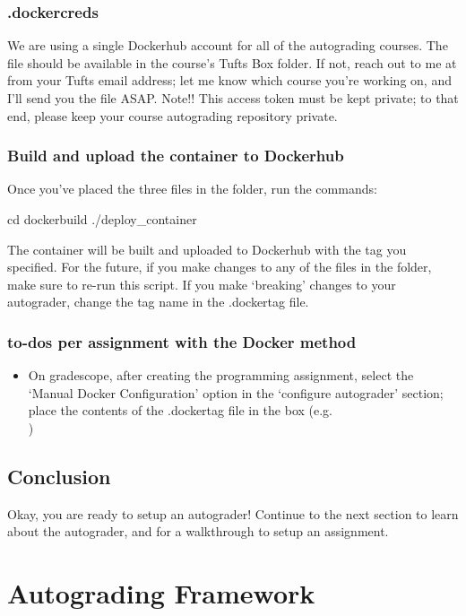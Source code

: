\documentclass[11pt]{report}
\begin{document}
\subsection*{.dockercreds}
We are using a single Dockerhub account for all of the autograding courses. The file
 should be available in the course's Tufts Box folder. If not, reach out to 
me at  from your Tufts email address; let me know which course you're 
working on, and I'll send you the file ASAP. 
Note!! This access token must be kept private; to that end, please keep your course autograding
repository private.

\subsection*{Build and upload the container to Dockerhub}
Once you've placed the three files in the  folder, run the commands:
\begin{bashcodeblock}
cd dockerbuild
./deploy_container
\end{bashcodeblock}
The container will be built and uploaded to Dockerhub with the tag you specified. For the future,
if you make changes to any of the files in the  folder, make sure to re-run this 
script. If you make `breaking' changes to your autograder, change the tag name in the .dockertag file.

\subsection*{to-dos per assignment with the Docker method} 
\begin{itemize}
      \item On gradescope, after creating the programming assignment, select the `Manual Docker 
      Configuration' option in the `configure autograder' section; place the contents of the 
      .dockertag file in the box (e.g. \\)
\end{itemize}

\section*{Conclusion}
Okay, you are ready to setup an autograder! Continue to the next section to learn 
about the autograder, and for a walkthrough to setup an assignment. 

\chapter*{Autograding Framework}
\end{document}
